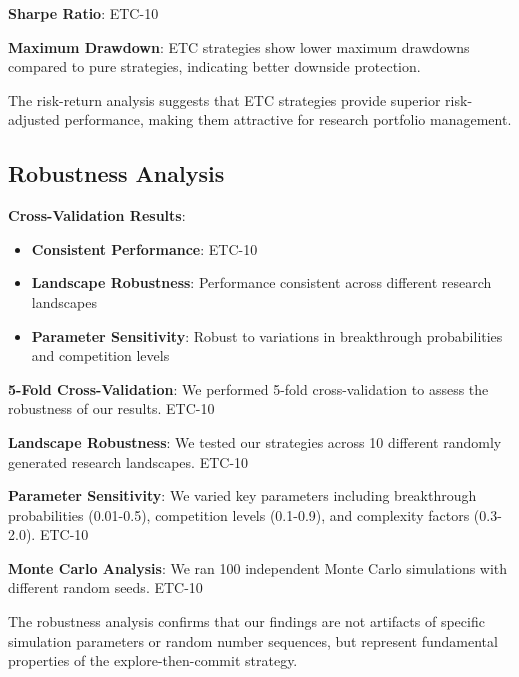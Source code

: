 \documentclass[letterpaper]{article} %
\begin{document}
\textbf{Sharpe Ratio}: ETC-10%

\textbf{Maximum Drawdown}: ETC strategies show lower maximum drawdowns compared to pure strategies, indicating better downside protection.

The risk-return analysis suggests that ETC strategies provide superior risk-adjusted performance, making them attractive for research portfolio management.

\subsection{Robustness Analysis}

\textbf{Cross-Validation Results}:
\begin{itemize}
\item \textbf{Consistent Performance}: ETC-10%
\item \textbf{Landscape Robustness}: Performance consistent across different research landscapes
\item \textbf{Parameter Sensitivity}: Robust to variations in breakthrough probabilities and competition levels
\end{itemize}

\textbf{5-Fold Cross-Validation}: We performed 5-fold cross-validation to assess the robustness of our results. ETC-10%

\textbf{Landscape Robustness}: We tested our strategies across 10 different randomly generated research landscapes. ETC-10%

\textbf{Parameter Sensitivity}: We varied key parameters including breakthrough probabilities (0.01-0.5), competition levels (0.1-0.9), and complexity factors (0.3-2.0). ETC-10%

\textbf{Monte Carlo Analysis}: We ran 100 independent Monte Carlo simulations with different random seeds. ETC-10%

The robustness analysis confirms that our findings are not artifacts of specific simulation parameters or random number sequences, but represent fundamental properties of the explore-then-commit strategy.
\end{document}
